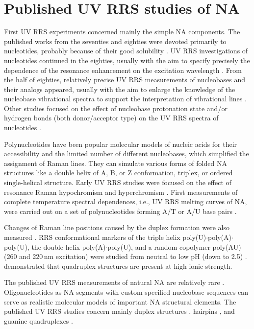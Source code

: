 \section{Published UV RRS studies of NA}

First UV RRS experiments concerned mainly the simple NA components.
The published works from the seventies and eighties were devoted primarily to
nucleotides, probably because of their good solubility
\parencite{Tsuboi1974}.
UV RRS investigations of nucleotides continued in the eighties, usually with
the aim to specify precisely the dependence of the resonance enhancement on the
excitation wavelength
\parencite{Ziegler1984}.
From the half of eighties, relatively precise UV RRS measurements of
nucleobases and their analogs appeared, usually with the aim to enlarge the
knowledge of the nucleobase vibrational spectra to support the interpretation
of vibrational lines
\parencite{Ghomi1986}.
Other studies focused on the effect of nucleobase protonation state and/or
hydrogen bonds (both donor/acceptor type) on the UV RRS spectra of nucleotides
\parencite{Gfrorer1991}.

Polynucleotides have been popular molecular models of nucleic acids for their
accessibility and the limited number of different nucleobases, which simplified
the assignment of Raman lines.
They can simulate various forms of folded NA structures like a double
helix of A, B, or Z conformation, triplex, or ordered single-helical structure.
Early UV RRS studies were focused on the effect of resonance Raman
hypochromism
\parencite{Pezolet1975}
and hyperchromism
\parencite{Chinsky1980}.
First measurements of complete temperature spectral dependences, i.e., UV RRS
melting curves of NA, were carried out on a set of polynucleotides forming A/T
or A/U base pairs
\parencite{Jolles1985}.

Changes of Raman line positions caused by the duplex formation were also
measured
\parencite{Grygon1990}.
RRS conformational markers of the triple helix
poly(U)$\cdot$poly(A)$\cdot$poly(U), the double helix poly(A)$\cdot$poly(U),
and a random copolymer poly(AU) (260 and 220\,nm excitation) were studied from
neutral to low pH (down to 2.5)
\parencite{Gfrorer1993a}.
\textcite{Wheeler1996}
demonstrated that quadruplex structures are present at
high ionic strength.

The published UV RRS measurements of natural NA are relatively rare
\parencite{%
	Laigle1982a,%
	Fodor1986a,%
	Wen1999,%
	Neugebauer2007,%
	Shaw2009%
}.
Oligonucleotides as NA segments with custom specified nucleobase sequences
can serve as realistic molecular models of important NA structural elements.
The published UV RRS studies concern mainly duplex structures
\parencite{Laigle1986},
hairpins
\parencite{Refregiers1997},
and guanine quadruplexes
\parencite{Mukerji1995}.

